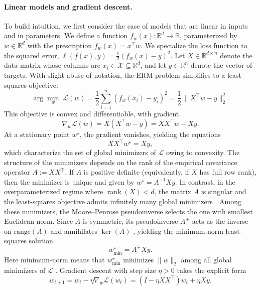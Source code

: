 \paragraph{Linear models and gradient descent.}
To build intuition, we first consider the case of models that are linear in inputs and in parameters.
We define a function $f_w(x): \mathbb{R}^d \to \mathbb{R}$, parameterized by $w \in \mathbb{R}^d$
with the prescription $f_w(x) = x^\top w$. We specialize the loss function to the squared
error, $\ell(f(x), y) =  \frac{1}{2}(f_w(x) - y)^2$.
Let $X\in\mathbb{R}^{d\times n}$ denote the data
matrix whose columns are $x_i \in \mathcal X \subseteq \mathbb{R}^d$, and let $y\in\mathbb{R}^n$ denote the vector
of targets. With slight abuse of notation, the ERM problem simplifies to a least-squares objective:
\begin{equation*}
	\arg\min_w \; \mathcal{L}(w)= \frac{1}{2} \sum_{i=1}^{n}(f_w(x_i) - y_i)^2 = \frac{1}{2}\,\|X^\top w-y\|_2^2.
\end{equation*}
This objective is convex and differentiable, with gradient
\begin{equation}
	\nabla_w \mathcal{L}(w)=X(X^\top w-y)=XX^\top w - Xy.
\end{equation}
At a stationary point $w^\star$, the gradient vanishes, yielding the equations
\begin{equation}
	XX^\top w^\star = Xy,
\end{equation}
which characterize the set of global minimizers of $\mathcal{L}$ owing to convexity.
The structure of the minimizers depends on the rank of the empirical covariance
operator $A := XX^\top$. If $A$ is positive definite (equivalently, if $X$ has
full row rank), then the minimizer is unique and given by $w^\star = A^{-1}Xy$.
In contrast, in the overparameterized regime where $\operatorname{rank}(X)<d$,
the matrix $A$ is singular and the least-squares objective admits infinitely
many global minimizers \citep{boyd2004convex, golub2013matrix}. Among these minimizers, the Moore--Penrose pseudoinverse
selects the one with smallest Euclidean norm. Since $A$ is symmetric, its
pseudoinverse $A^{+}$ acts as the inverse on $\mathrm{range}(A)$ and annihilates
$\ker(A)$ \citep{penrose1955generalized, golub2013matrix}, yielding the minimum-norm least-squares solution
\[
	w^\star_{\min} = A^{+}Xy.
\]
Here minimum-norm means that \(w^\star_{\min}\) minimizes \(\|w\|_2\) among all
global minimizers of \(\mathcal L\) \citep{gunasekar2018characterizing}.
Gradient descent with step size $\eta>0$ takes the explicit form
\begin{equation}
	w_{t+1}=w_t-\eta \nabla_w \mathcal{L}(w_t)
	=\left(I-\eta XX^\top\right)w_t+\eta Xy.
\end{equation}
